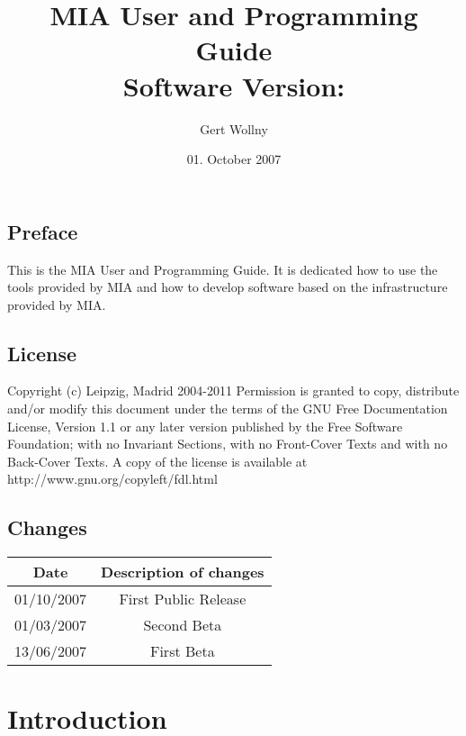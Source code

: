 \documentclass[english, 10pt, a4paper,headsepline,openany]{scrbook}
\begin{document}
\vfill{}
\title{MIA User and Programming Guide \\Software Version: \miaversion}
\vfill{}


\date{01. October 2007}


\author{Gert Wollny}

\maketitle

\section*{Preface}

This is the MIA User and Programming Guide. 
It is dedicated how to use the tools provided by MIA and how to develop software based on the infrastructure provided by MIA.


\section*{License}

Copyright (c) Leipzig, Madrid 2004-2011
Permission is granted to copy, distribute and/or modify this document under the terms of the GNU Free Documentation License, Version 1.1
  or any later version published by the Free Software Foundation; with no Invariant Sections, 
  with no Front-Cover Texts and with no Back-Cover Texts. 
A copy of the license is available at http://www.gnu.org/copyleft/fdl.html

\section*{Changes}

\begin{center}
\begin{tabular}{|c|c|}
\hline 
Date  & Description of changes\\
\hline
\hline 
01/10/2007 & First Public Release  \\
01/03/2007 & Second Beta \\
13/06/2007 & First Beta  \\
\hline
\end{tabular}
\end{center}

\tableofcontents{}

\pagestyle{headings}


\chapter{Introduction}
\end{document}
